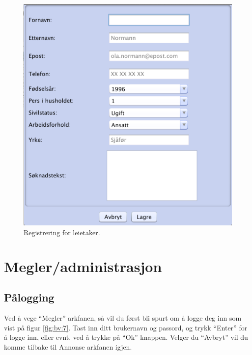 \begin{figure}[h!]
\center
 \includegraphics[scale=0.7]{./img/brukerveiledning/6.png}
 \caption{Registrering for leietaker.}
 \label{fig:bv:6}
\end{figure}





\newpage
\section{Megler/administrasjon}

\subsection{Pålogging}

Ved å vege “Megler” arkfanen, så vil du først bli spurt om å logge deg inn som vist på figur \ref{fig:bv:7}.
Tast inn ditt brukernavn og passord, og trykk “Enter” for å logge inn, eller evnt. ved å trykke på “Ok”
knappen. Velger du “Avbryt” vil du komme tilbake til Annonse arkfanen igjen.

